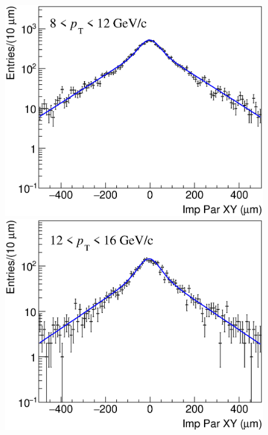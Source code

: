 \documentclass[b5paper,10pt,twoside,oldstyle,classica]{toptesi}
\begin{document}
\begin{figure}[h]
\begin{center}
\hspace{0cm}
{\includegraphics[scale = 0.24]{ImpParRecoFD_8-12.eps}}
\vspace{0cm}
{\includegraphics[scale = 0.24]{ImpParRecoFD_12-16.eps}}
\end{center}
\end{figure}
\clearpage
\end{document}
